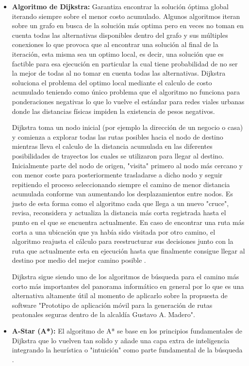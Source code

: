 \begin{itemize}
    \item \textbf{Algoritmo de Dijkstra:} Garantiza encontrar la solución óptima global iterando siempre sobre el menor costo acumulado. Algunos algoritmos iteran sobre un grafo en busca de la solución más optima pero en veces no toman en cuenta todas las alternativas disponibles dentro del grafo y sus múltiples conexiones lo que provoca que al encontrar una solución al final de la iteración, esta misma sea un optimo local, es decir, una solución que es factible para esa ejecución en particular la cual tiene probabilidad de no ser la mejor de todas al no tomar en cuenta todas las alternativas. Dijkstra soluciona el problema del optimo local mediante el calculo de costo acumulado teniendo como único problema que el algoritmo no funciona para ponderaciones negativas lo que lo vuelve el estándar para redes viales urbanas donde las distancias físicas impiden la existencia de pesos negativos. 

    Dijkstra toma un nodo inicial (por ejemplo la dirección de un negocio o casa) y comienza a explorar todas las rutas posibles hacia el nodo de destino mientras lleva el calculo de la distancia acumulada en las diferentes posibilidades de trayectos los cuales se utilizaron para llegar al destino. Inicialmente parte del nodo de origen, "visita" primero al nodo más cercano y con menor coste para posteriormente trasladarse a dicho nodo y seguir repitiendo el proceso seleccionando siempre el camino de menor distancia acumulada conforme van aumentando los desplazamientos entre nodos. Es justo de esta forma como el algoritmo cada que llega a un nuevo "cruce", revisa, reconsidera y actualiza la distancia más corta registrada hasta el punto en el que se encuentra actualmente. En caso de encontrar una ruta más corta a una ubicación que ya había sido visitada por otro camino, el algoritmo reajusta el cálculo para reestructurar sus decisiones junto con la ruta que actualmente esta en ejecución hasta que finalmente consigue llegar al destino por medio del mejor camino posible \cite{dijkstra_udit}. 

    Dijkstra sigue siendo uno de los algoritmos de búsqueda para el camino más corto más importantes del panorama informático en general por lo que es una alternativa altamente útil al momento de aplicarlo sobre la propuesta de software "Prototipo de aplicación móvil para la generación de rutas peatonales seguras dentro de la alcaldía Gustavo A. Madero". 
    
    \item \textbf{A-Star (A*):} El algoritmo de A* se base en los principios fundamentales de Dijkstra que lo vuelven tan solido y añade una capa extra de inteligencia integrando la heurística o "intuición" como parte fundamental de la búsqueda \cite{dijkstra_udit}. 


\end{itemize}
